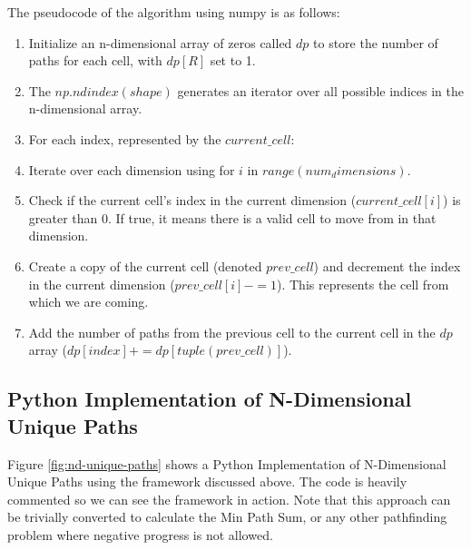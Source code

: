 The pseudocode of the algorithm using numpy is as follows:

\begin{enumerate}
    \item Initialize an n-dimensional array of zeros called $dp$ to store the number of paths for each cell, with $dp[R]$ set to 1.
    \item The $np.ndindex(shape)$ generates an iterator over all possible indices in the n-dimensional array.
    \item For each index, represented by the $current\_cell$:
    \item Iterate over each dimension using for $i$ in $range(num_dimensions)$.
    \item Check if the current cell's index in the current dimension ($current\_cell[i]$) is greater than 0. If true, it means there is a valid cell to move from in that dimension.
    \item Create a copy of the current cell (denoted $prev\_cell$) and decrement the index in the current dimension ($prev\_cell[i] -= 1$). This represents the cell from which we are coming.
    \item Add the number of paths from the previous cell to the current cell in the $dp$ array ($dp[index] += dp[tuple(prev\_cell)]$).

\end{enumerate}

\subsection{Python Implementation of N-Dimensional Unique Paths}

Figure \ref{fig:nd-unique-paths} shows a Python Implementation of N-Dimensional Unique Paths using the framework discussed above.
The code is heavily commented so we can see the framework in action. Note that this approach can be trivially converted to calculate the Min Path Sum, or any other pathfinding problem where negative progress is not allowed.

